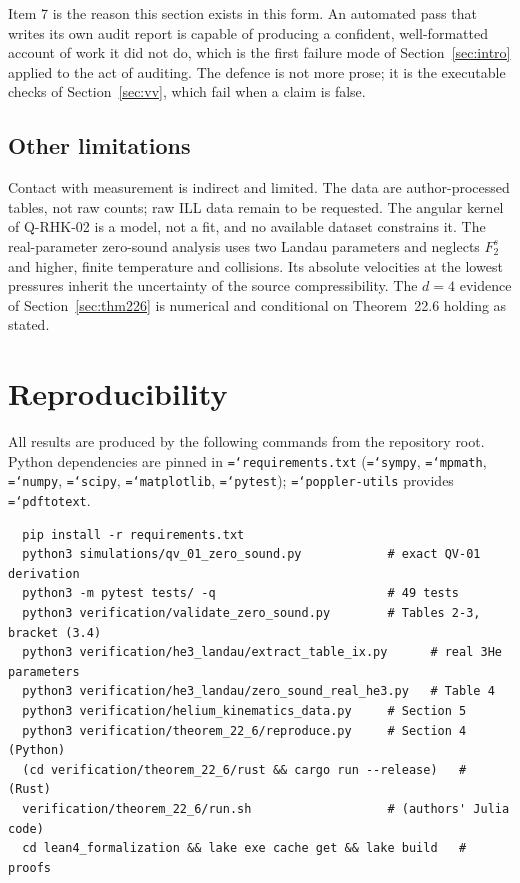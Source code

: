 \documentclass[11pt,a4paper]{article}
\newcommand{\code}[1]{\texttt{\hyphenchar\font=`\-\relax #1}}
\begin{document}
Item 7 is the reason this section exists in this form. An automated pass that
writes its own audit report is capable of producing a confident, well-formatted
account of work it did not do, which is the first failure mode of
Section~\ref{sec:intro} applied to the act of auditing. The defence is not
more prose; it is the executable checks of Section~\ref{sec:vv}, which fail
when a claim is false.

\subsection{Other limitations}

Contact with measurement is indirect and limited. The data are author-processed tables, not raw
counts; raw ILL data remain to be requested. The angular kernel of Q-RHK-02 is a model, not a fit,
and no available dataset constrains it. The real-parameter zero-sound analysis uses two Landau
parameters and neglects $F_2^s$ and higher, finite temperature and collisions. Its absolute
velocities at the lowest pressures inherit the uncertainty of the source compressibility. The
$d=4$ evidence of Section~\ref{sec:thm226} is numerical and conditional on Theorem~22.6 holding
as stated.

\section{Reproducibility}

All results are produced by the following commands from the repository root. Python
dependencies are pinned in \code{requirements.txt} (\code{sympy}, \code{mpmath}, \code{numpy},
\code{scipy}, \code{matplotlib}, \code{pytest}); \code{poppler-utils} provides \code{pdftotext}.

\begin{verbatim}
  pip install -r requirements.txt
  python3 simulations/qv_01_zero_sound.py            # exact QV-01 derivation
  python3 -m pytest tests/ -q                        # 49 tests
  python3 verification/validate_zero_sound.py        # Tables 2-3, bracket (3.4)
  python3 verification/he3_landau/extract_table_ix.py      # real 3He parameters
  python3 verification/he3_landau/zero_sound_real_he3.py   # Table 4
  python3 verification/helium_kinematics_data.py     # Section 5
  python3 verification/theorem_22_6/reproduce.py     # Section 4 (Python)
  (cd verification/theorem_22_6/rust && cargo run --release)   # (Rust)
  verification/theorem_22_6/run.sh                   # (authors' Julia code)
  cd lean4_formalization && lake exe cache get && lake build   # proofs
\end{verbatim}
\end{document}
